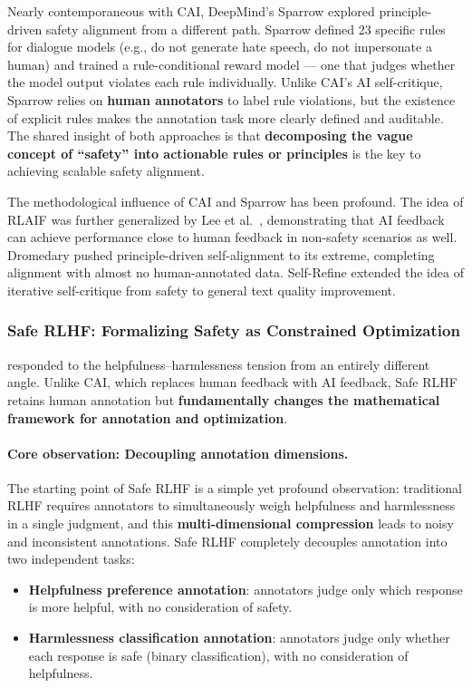 \noindent
Nearly contemporaneous with CAI, DeepMind's Sparrow \citep{glaese2022sparrow}
explored principle-driven safety alignment from a different path.
Sparrow defined 23 specific rules for dialogue models (e.g., do not generate hate speech, do not impersonate a human)
and trained a rule-conditional reward model ---
one that judges whether the model output violates each rule individually.
Unlike CAI's AI self-critique, Sparrow relies on \textbf{human annotators}
to label rule violations, but the existence of explicit rules makes the annotation task more clearly defined and auditable.
The shared insight of both approaches is that \textbf{decomposing the vague concept of ``safety'' into actionable rules or principles}
is the key to achieving scalable safety alignment.

The methodological influence of CAI and Sparrow has been profound. The idea of RLAIF was further generalized by Lee et al.\ \cite{lee2023rlaif},
demonstrating that AI feedback can achieve performance close to human feedback in non-safety scenarios as well.
Dromedary \cite{sun2023dromedary} pushed principle-driven self-alignment to its extreme,
completing alignment with almost no human-annotated data.
Self-Refine \cite{madaan2023selfrefine} extended the idea of iterative self-critique
from safety to general text quality improvement.

\subsubsection{Safe RLHF: Formalizing Safety as Constrained Optimization}
\label{sec:t3-saferlhf}

 responded to the helpfulness--harmlessness tension from an entirely different angle.
Unlike CAI, which replaces human feedback with AI feedback,
Safe RLHF retains human annotation but \textbf{fundamentally changes the mathematical framework for annotation and optimization}.

\paragraph{Core observation: Decoupling annotation dimensions.}
The starting point of Safe RLHF is a simple yet profound observation:
traditional RLHF requires annotators to simultaneously weigh helpfulness and harmlessness in a single judgment,
and this \textbf{multi-dimensional compression} leads to noisy and inconsistent annotations.
Safe RLHF completely decouples annotation into two independent tasks:
\begin{itemize}[leftmargin=2em]
  \item \textbf{Helpfulness preference annotation}: annotators judge only which response is more helpful,
    with no consideration of safety.
  \item \textbf{Harmlessness classification annotation}: annotators judge only whether each response is safe
    (binary classification), with no consideration of helpfulness.
\end{itemize}


